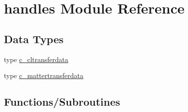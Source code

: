 \hypertarget{namespacehandles}{}\section{handles Module Reference}
\label{namespacehandles}
\subsection*{Data Types}
\begin{DoxyCompactItemize}
\item 
type \mbox{\hyperlink{structhandles_1_1c__cltransferdata}{c\+\_\+cltransferdata}}
\item 
type \mbox{\hyperlink{structhandles_1_1c__mattertransferdata}{c\+\_\+mattertransferdata}}
\end{DoxyCompactItemize}
\subsection*{Functions/\+Subroutines}
